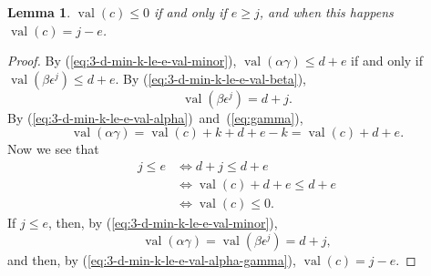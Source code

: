 \documentclass{amsart}
\newtheorem{lemma}{Lemma}[subsection]
\theoremstyle{definition}
\def\e{\epsilon}
\def\val{\mathop{\mathrm{val}}}
\begin{document}
  \begin{lemma}
    \label{lemma:3-d-min-k-le-e-val-c}
    $\val(c) \le 0$ if and only if $e \ge j$, and when this happens
    $\val(c) = j - e$.
  \end{lemma}
  \begin{proof}
    By (\ref{eq:3-d-min-k-le-e-val-minor}), $\val(\alpha\gamma) \le d + e$ if
    and only if $\val(\beta\e^j) \le d + e$.  By
    (\ref{eq:3-d-min-k-le-e-val-beta}),
    \begin{equation*}
      \val(\beta\e^j) = d + j.
    \end{equation*}
    By (\ref{eq:3-d-min-k-le-e-val-alpha})~and~(\ref{eq:gamma}),
    \begin{equation}
      \label{eq:3-d-min-k-le-e-val-alpha-gamma}
      \val(\alpha\gamma) = \val(c) + k + d + e - k = \val(c) + d + e.
    \end{equation}
    Now we see that
    \begin{align*}
      j \le e &\iff d + j \le d + e \\
              &\iff \val(c) + d + e \le d + e \\
              &\iff \val(c) \le 0.
    \end{align*}
    If $j \le e$, then, by (\ref{eq:3-d-min-k-le-e-val-minor}),
    \begin{equation*}
      \val(\alpha\gamma) = \val(\beta\e^j) = d + j,
    \end{equation*}
    and then, by (\ref{eq:3-d-min-k-le-e-val-alpha-gamma}), $\val(c) = j - e$.
  \end{proof}
\end{document}
